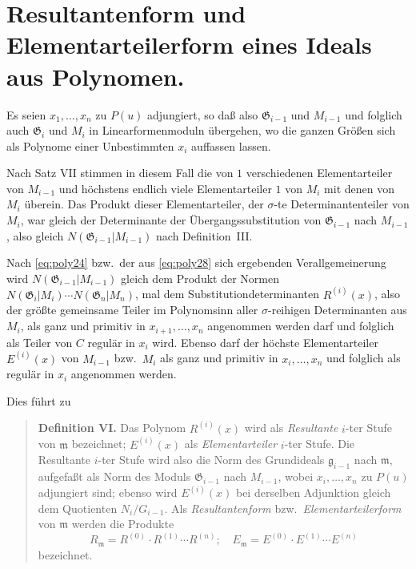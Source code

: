 \documentclass[fontsize=10pt,paper=a5,pagesize,headings=small]{scrbook}
\newcommand{\ideal}[1]{\mathfrak{#1}}
\theoremstyle{plain}
\begin{document}
\section{Resultantenform und Elementarteilerform eines Ideals aus Polynomen.}
\setcounter{section}{5}

Es seien $x_1,\dots,x_n$ zu $P(u)$ adjungiert, so daß also $\mathfrak{G}_{i-1}$ und $M_{i-1}$ und folglich
auch $\mathfrak{G}_i$ und $M_i$ in Linearformenmoduln übergehen, wo die ganzen Größen sich als
Polynome einer Unbestimmten $x_i$ auffassen lassen.

Nach Satz VII stimmen in diesem Fall die von $1$ verschiedenen Elementarteiler
von $M_{i-1}$ und höchstens endlich viele Elementarteiler $1$ von $M_i$ mit denen von
$M_i$ überein. Das Produkt dieser Elementarteiler, der $\sigma$-te Determinantenteiler von
$M_i$, war gleich der Determinante der Übergangssubstitution von $\mathfrak{G}_{i-1}$ nach $M_{i-1}$,
also gleich $N(\mathfrak{G}_{i-1}|M_{i-1})$ nach Definition~III.

\newpage
\setcounter{page}{441}

Nach \eqref{eq:poly24} bzw.~der aus \eqref{eq:poly28} sich ergebenden Verallgemeinerung
wird $N(\mathfrak{G}_{i-1}|M_{i-1})$ gleich dem Produkt der Normen $N(\mathfrak{G}_i|M_i) \cdots N(\mathfrak{G}_n|M_n)$,
mal dem Substitutiondeterminanten $R^{(i)}(x)$, also der größte gemeinsame Teiler im
Polynomsinn aller $\sigma$-reihigen Determinanten aus $M_i$, als ganz und primitiv in
$x_{i+1},\dots,x_n$ angenommen werden darf und folglich als Teiler von $C$ regulär in $x_i$
wird. Ebenso darf der höchste Elementarteiler $E^{(i)}(x)$ von $M_{i-1}$ bzw.~$M_i$ als ganz
und primitiv in $x_i,\dots,x_n$ und folglich als regulär in $x_i$ angenommen werden.

Dies führt zu

\begin{quote}
\textbf{Definition VI.} Das Polynom $R^{(i)}(x)$ wird als \textit{Resultante} $i$-ter Stufe von
$\ideal{m}$ bezeichnet; $E^{(i)}(x)$ als \textit{Elementarteiler} $i$-ter Stufe. Die Resultante $i$-ter
Stufe wird also die Norm des Grundideals $\ideal{g}_{i-1}$ nach $\ideal{m}$, aufgefaßt als Norm des
Moduls $\mathfrak{G}_{i-1}$ nach $M_{i-1}$, wobei $x_i,\dots,x_n$ zu $P(u)$ adjungiert sind; ebenso wird
$E^{(i)}(x)$ bei derselben Adjunktion gleich dem Quotienten $N_i/G_{i-1}$. Als
\textit{Resultantenform} bzw.~\textit{Elementarteilerform} von $\ideal{m}$ werden die Produkte
\[ R_{\ideal{m}} = R^{(0)} \cdot R^{(1)} \cdots R^{(n)};\quad E_{\ideal{m}} = E^{(0)} \cdot E^{(1)} \cdots E^{(n)} \]
bezeichnet.
\end{quote}
\end{document}
